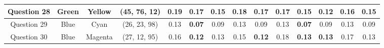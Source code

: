 \begin{table}[!htbp]
{\begin{tabular}{@{}cccccclccccclcccc@{}}
    \multicolumn{1}{c|}{Question 28} & \multicolumn{1}{c|}{Green}   & \multicolumn{1}{c|}{Yellow}  & \multicolumn{2}{c||}{\cellcolor[HTML]{80FF00}(45, 76, 12)}                                                             & \multicolumn{2}{c|}{0.19}                                  & \multicolumn{1}{c|}{0.17}                                  & \multicolumn{1}{c|}{\cellcolor[HTML]{32CB00}\textbf{0.15}} & \multicolumn{1}{c|}{0.18}                                  & \multicolumn{1}{c||}{0.17}                                  & \multicolumn{2}{c|}{0.17}                                  & \multicolumn{1}{c|}{0.15}                                  & \multicolumn{1}{c|}{\cellcolor[HTML]{32CB00}\textbf{0.12}} & \multicolumn{1}{c|}{0.16}                                  & \multicolumn{1}{c|}{0.15}                                  \\ \midrule
    \multicolumn{1}{c|}{Question 29} & \multicolumn{1}{c|}{Blue}    & \multicolumn{1}{c|}{Cyan}    & \multicolumn{2}{c||}{\cellcolor[HTML]{0080FF}(26, 23, 98)}                                                             & \multicolumn{2}{c|}{0.13}                                  & \multicolumn{1}{c|}{\cellcolor[HTML]{32CB00}\textbf{0.07}} & \multicolumn{1}{c|}{0.09}                                  & \multicolumn{1}{c|}{0.13}                                  & \multicolumn{1}{c||}{0.09}                                  & \multicolumn{2}{c|}{0.13}                                  & \multicolumn{1}{c|}{\cellcolor[HTML]{32CB00}\textbf{0.07}} & \multicolumn{1}{c|}{0.09}                                  & \multicolumn{1}{c|}{0.13}                                  & \multicolumn{1}{c|}{0.09}                                  \\ \midrule
    \multicolumn{1}{c|}{Question 30} & \multicolumn{1}{c|}{Blue}    & \multicolumn{1}{c|}{Magenta} & \multicolumn{2}{c||}{\cellcolor[HTML]{8000FF}(27, 12, 95)}                                                             & \multicolumn{2}{c|}{0.16}                                  & \multicolumn{1}{c|}{\cellcolor[HTML]{32CB00}\textbf{0.12}} & \multicolumn{1}{c|}{0.13}                                  & \multicolumn{1}{c|}{0.15}                                  & \multicolumn{1}{c||}{\cellcolor[HTML]{32CB00}\textbf{0.12}} & \multicolumn{2}{c|}{0.18}                                  & \multicolumn{1}{c|}{\cellcolor[HTML]{32CB00}\textbf{0.13}} & \multicolumn{1}{c|}{\cellcolor[HTML]{32CB00}\textbf{0.13}} & \multicolumn{1}{c|}{0.17}                                  & \multicolumn{1}{c|}{0.13}                                  \\ \midrule

\end{tabular}}
\end{table}
